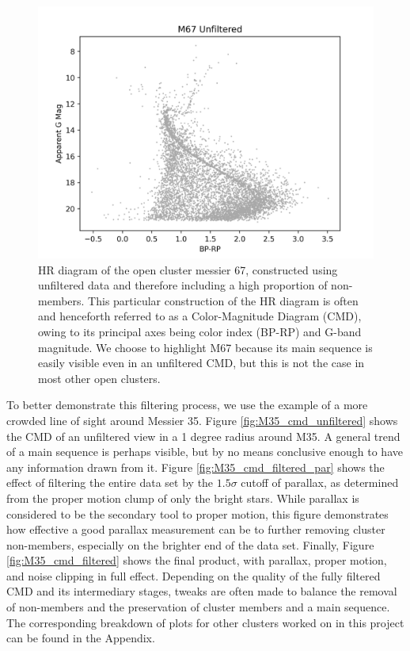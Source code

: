 \documentclass[onecolumn,table,xcdraw,super]{aastex631}
\begin{document}
\begin{figure}[]
	\centering
      \includegraphics[width=4.5in]{figures/M67_cmd_unfiltered.png}
	\caption{HR diagram of the open cluster messier 67, constructed using unfiltered data and therefore including a high proportion of non-members. This particular construction of the HR diagram is often and henceforth referred to as a Color-Magnitude Diagram (CMD), owing to its principal axes being color index (BP-RP) and G-band magnitude. We choose to highlight M67 because its main sequence is easily visible even in an unfiltered CMD, but this is not the case in most other open clusters.}
	\label{fig:M67_cmd_unfiltered}
\end{figure}


To better demonstrate this filtering process, we use the example of a more crowded line of sight around Messier 35. Figure \ref{fig:M35_cmd_unfiltered} shows the CMD of an unfiltered view in a 1 degree radius around M35. A general trend of a main sequence is perhaps visible, but by no means conclusive enough to have any information drawn from it. Figure \ref{fig:M35_cmd_filtered_par} shows the effect of filtering the entire data set by the $1.5\sigma$ cutoff of parallax, as determined from the proper motion clump of only the bright stars. While parallax is considered to be the secondary tool to proper motion, this figure demonstrates how effective a good parallax measurement can be to further removing cluster non-members, especially on the brighter end of the data set. Finally, Figure \ref{fig:M35_cmd_filtered} shows the final product, with parallax, proper motion, and noise clipping in full effect. Depending on the quality of the fully filtered CMD and its intermediary stages, tweaks are often made to balance the removal of non-members and the preservation of cluster members and a main sequence. The corresponding breakdown of plots for other clusters worked on in this project can be found in the Appendix.
\end{document}
